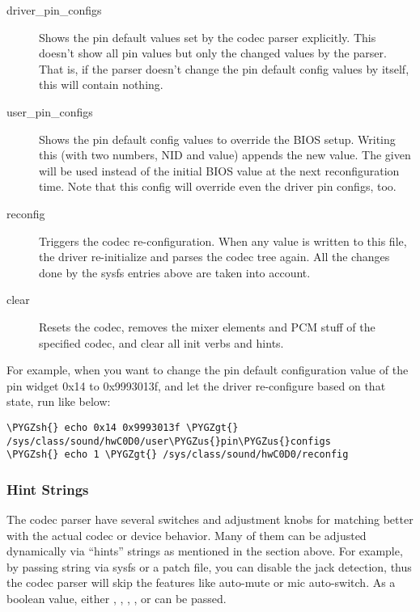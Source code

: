 \documentclass[a4paper,8pt,english]{sphinxmanual}
\def\PYGZus{\char`\_}
\def\PYGZgt{\char`\>}
\def\PYGZsh{\char`\#}
\begin{document}
\begin{description}
\item[{driver\_pin\_configs}] \leavevmode
Shows the pin default values set by the codec parser explicitly.
This doesn't show all pin values but only the changed values by
the parser.  That is, if the parser doesn't change the pin default
config values by itself, this will contain nothing.

\item[{user\_pin\_configs}] \leavevmode
Shows the pin default config values to override the BIOS setup.
Writing this (with two numbers, NID and value) appends the new
value.  The given will be used instead of the initial BIOS value at
the next reconfiguration time.  Note that this config will override
even the driver pin configs, too.

\item[{reconfig}] \leavevmode
Triggers the codec re-configuration.  When any value is written to
this file, the driver re-initialize and parses the codec tree
again.  All the changes done by the sysfs entries above are taken
into account.

\item[{clear}] \leavevmode
Resets the codec, removes the mixer elements and PCM stuff of the
specified codec, and clear all init verbs and hints.

\end{description}

For example, when you want to change the pin default configuration
value of the pin widget 0x14 to 0x9993013f, and let the driver
re-configure based on that state, run like below:

\begin{Verbatim}[commandchars=\\\{\}]
\PYGZsh{} echo 0x14 0x9993013f \PYGZgt{} /sys/class/sound/hwC0D0/user\PYGZus{}pin\PYGZus{}configs
\PYGZsh{} echo 1 \PYGZgt{} /sys/class/sound/hwC0D0/reconfig
\end{Verbatim}


\subsubsection{Hint Strings}
\label{sound/hd-audio/notes:hint-strings}
The codec parser have several switches and adjustment knobs for
matching better with the actual codec or device behavior.  Many of
them can be adjusted dynamically via ``hints'' strings as mentioned in
the section above.  For example, by passing  string
via sysfs or a patch file, you can disable the jack detection, thus
the codec parser will skip the features like auto-mute or mic
auto-switch.  As a boolean value, either , , , ,
 or  can be passed.
\end{document}

